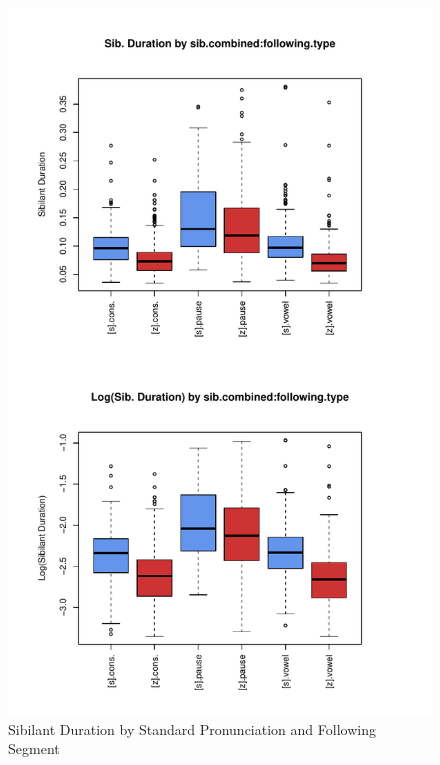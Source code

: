 \documentclass[a4paper]{article}
\begin{document}
\begin{figure}[h!]
  \begin{center}
    \begin{minipage}[t]{0.8\linewidth}
      \begin{center}
\includegraphics{prelim-061}
      \end{center}
    \end{minipage}
    \caption{Sibilant Duration by Standard Pronunciation and Following Segment}
    \label{fig:sib.dur.by.sib}
  \end{center}
\end{figure}
\end{document}

